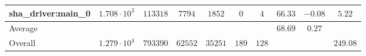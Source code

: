 \begin{tabular}{|l|c|c|c|c|c|c|c|c|c|}
sha\_driver:main\_0     & $ 1.708 \cdot 10^{3} $ & $ 113318 $ & $ 7794  $ & $ 1852  $ & $ 0   $ & $ 4   $ & $ 66.33       $ & $ -0.08   $ & $ 5.22    $ \\
\hline
Average                 & $                    $ & $        $ & $       $ & $       $ & $     $ & $     $ & $ 68.69       $ & $ 0.27    $ & $         $ \\
\hline
Overall                 & $ 1.279 \cdot 10^{4} $ & $ 793390 $ & $ 62552 $ & $ 35251 $ & $ 189 $ & $ 128 $ & $             $ & $         $ & $ 249.08  $ \\
\hline
\end{tabular}
